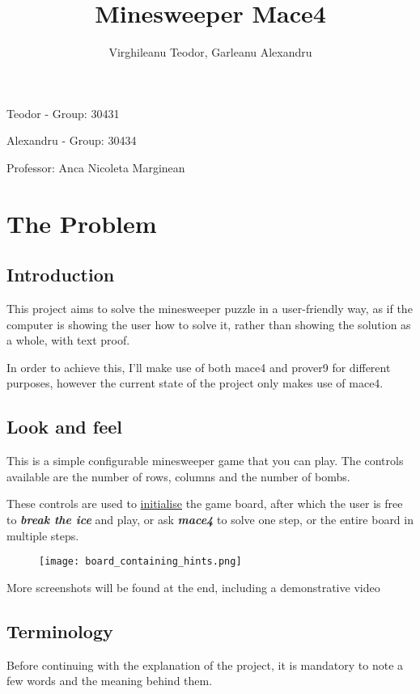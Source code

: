 \documentclass{article}
\title{Minesweeper Mace4}
\author{Virghileanu Teodor, Garleanu Alexandru}
\begin{document}
	\maketitle
	\vspace*{\fill}
	Teodor - Group: 30431 \par
	Alexandru - Group: 30434 \par
	Professor: Anca Nicoleta Marginean
	\newpage

\tableofcontents
\clearpage

\section{The Problem}
	\subsection{Introduction}
	
	    This project aims to solve the minesweeper puzzle in a user-friendly way, as if the computer is showing the user how to solve it, rather than showing the solution as a whole, with text proof.
		
		In order to achieve this, I'll make use of both mace4 and prover9 for different purposes, however the current state of the project only makes use of mace4.
		
	\subsection{Look and feel}
	    This is a simple configurable minesweeper game that you can play. The controls available are the number of rows, columns and the number of bombs.
	    
	    These controls are used to \underline{initialise} the game board, after which the user is free to \textbf{\textit{break the ice}} and play, or ask \textbf{\textit{mace4}} to solve one step, or the entire board in multiple steps.
	    
	    \begin{figure}[H]
            \centering
            \texttt{[image: board\_containing\_hints.png]}
        \end{figure}
        
        More screenshots will be found at the end, including a demonstrative video
	
	\subsection{Terminology}	
		Before continuing with the explanation of the project, it is mandatory to note a few words and the meaning behind them.
		
\end{document}
